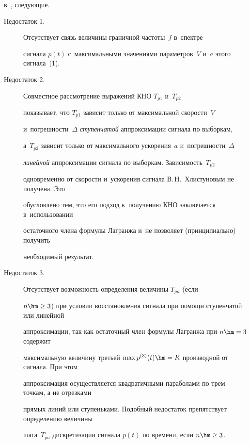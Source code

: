  в~\cite{12-m, 13-m}, следующие.


   \begin{description}


 \item[Недостаток 1.] Отсутствует связь величины граничной частоты~$f$ в~спектре 


сигнала $p(t)$ с~максимальными значениями параметров~$V$ и~$a$ этого сигнала~(1).


  


  \item[Недостаток 2.] Совместное рассмотрение выражений КНО $T_{p1}$ и~$T_{p2}$ 


показывает, что $T_{p1}$ зависит только от максимальной скорости~$V$ 


и~погрешности~$\Delta$ \textit{ступенчатой} аппроксимации сигнала по выборкам, 


а~$T_{p2}$ зависит только от максимального ускорения~$a$ и~погрешности~$\Delta$ 


\textit{линейной} аппроксимации сигнала по выборкам. Зависимость~$T_{p2}$ 


одновременно от скорости и~ускорения сигнала В.\,Н.~Хлистуновым не получена. Это 


обусловлено тем, что его подход к~получению КНО заключается в~использовании 


остаточного члена формулы Лагранжа и~не позволяет (принципиально) получить 


необходимый результат.


  


    \item[Недостаток 3.] Отсутствует возможность определения величины $T_{pn}$ (если 


$n\hm\geq 3$) при условии восстановления сигнала при помощи ступенчатой или линейной 


аппроксимации, так как остаточный член формулы Лагранжа при $n \hm= 3$ содержит 


максимальную величину третьей $\max p^{(3)}(t)\hm=R$ производной от сигнала. При этом 


аппроксимация осуществляется квадратичными параболами по трем точкам, а не отрезками 


прямых линий или ступеньками. Подобный недостаток препятствует определению величины 


шага~$T_{pn}$ дискретизации сигнала $p(t)$ по времени, если $n\hm\geq 3$.


\end{description}


